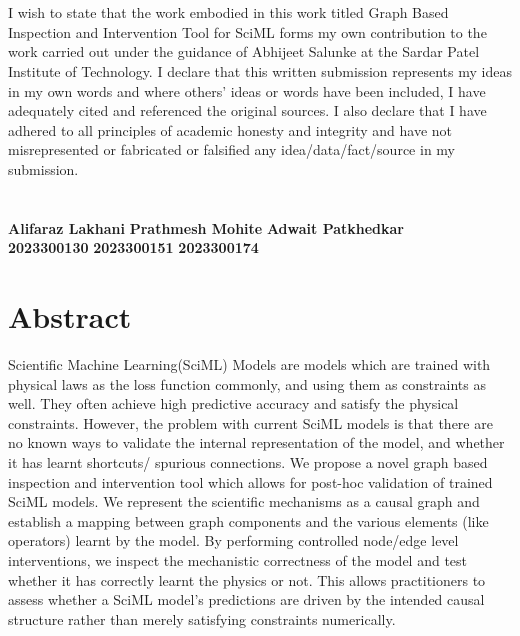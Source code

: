 \documentclass[12pt,singleside,a4paper]{article}
\begin{document}


\section*{}

\vspace{3.5cm}
I wish to state that the work embodied in this work titled Graph Based Inspection and Intervention Tool for SciML forms my own contribution to the work carried out under the guidance of Abhijeet Salunke at the Sardar Patel Institute of Technology. I declare that this written submission represents my ideas in my own words and where others' ideas or words have been included, I have adequately cited and referenced the original sources. I also declare that I have adhered to all principles of academic honesty and integrity and have not misrepresented or fabricated or falsified any idea/data/fact/source in my submission.
\\
\\
\\
\textbf{Alifaraz Lakhani} \hspace{2cm} \textbf{Prathmesh Mohite} \hspace{1cm} \textbf{Adwait Patkhedkar}\\ 
\vspace{4cm}
\textbf{2023300130} \hspace{3cm} \textbf{2023300151} \hspace{3cm} \textbf{2023300174}\\ 
\vspace{1cm}















\pagebreak
\section*{Abstract}
 Scientific Machine Learning(SciML) Models are models which are trained with physical laws as the loss function commonly, and using them as constraints as well. They often achieve high predictive accuracy and satisfy the physical constraints. However, the problem with current SciML models is that there are no known ways to validate the internal representation of the model, and whether it has learnt shortcuts/ spurious connections. We propose a novel graph based inspection and intervention tool which allows for post-hoc validation of trained SciML models. We represent the scientific mechanisms as a causal graph and establish a mapping between graph components and the various elements (like operators) learnt by the model. By performing controlled node/edge level interventions, we inspect the mechanistic correctness of the model and test whether it has correctly learnt the physics or not. This allows practitioners to assess whether a SciML model’s predictions are driven by the intended causal structure rather than merely satisfying constraints numerically. 
\pagebreak
\end{document}
